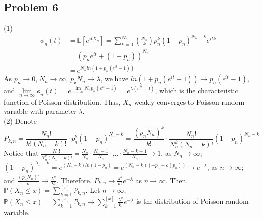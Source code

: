 \documentclass[12pt]{article}
\begin{document}
	\subsection*{Problem 6}
	(1)\begin{align*}
	\phi_{n}(t)&= \mathbb{E}[e^{itX_{n}}]=\sum_{k=0}^{N_{n}}\binom{N_{n}}{k}p_n^{k}(1-p_n)^{N_{n}-k}e^{itk}\\
	&=(p_{n}e^{it}+(1-p_n))^{N_{n}}\\
	&=e^{N_{n}ln(1+p_{n}(e^{it}-1))}
\end{align*}
As $p_n\rightarrow 0$, $N_{n}\rightarrow\infty$, $p_{n}N_{n}\rightarrow \lambda$, we have $ln(1+p_{n}(e^{it}-1))\rightarrow p_{n}(e^{it}-1)$, and $\lim\limits_{n\rightarrow\infty}\phi_{n}(t)= e^{\lim\limits_{n\rightarrow\infty}N_{n}p_{n}(e^{it}-1)}=e^{\lambda (e^{it}-1)}$, which is the characteristic function of Poisson distribution. Thus, $X_{n}$ weakly converges to Poisson random variable with parameter $\lambda$.\\
(2) Denote $$P_{k,n}=\frac{N_{n}!}{k!(N_{n}-k)!}\cdot p_{n}^{k}(1-p_{n})^{N_{n}-k}=\frac{(p_{n}N_{n})^{k}}{k!}\cdot \frac{N_{n}!}{N_{n}^{k}(N_{n}-k)!}(1-p_{n})^{N_{n}-k}$$
Notice that $\frac{N_{n}!}{N_{n}^{k}(N_{n}-k)!}=\frac{N_{n}}{N_{n}}\cdot\frac{N_{n}-1}{N_{n}}\cdot\dots\cdot\frac{N_{n}-k+1}{N_{n}}\rightarrow 1$, as $N_{n}\rightarrow\infty$;\\ 

	$(1-p_{n})^{N_{n}-k}=e^{(N_{n}-k)ln(1-p_{n})}=e^{(N_{n}-k)(-p_{n}+o(p_{n}))}\rightarrow e^{-\lambda}$, as $n\rightarrow\infty$; \\ and $\frac{(p_{n}N_{n})^{k}}{k!}\rightarrow\frac{\lambda^{k}}{k!}$. Therefore, $P_{k,n}\rightarrow\frac{\lambda^{k}}{k!}e^{-\lambda}$ as $n\rightarrow\infty$. Then, $\mathbb{P}(X_{n}\leqslant x)=\sum_{k=1}^{[x]}P_{k,n}$. Let $n\rightarrow\infty$, $\mathbb{P}(X_{n}\leqslant x)=\sum_{k=1}^{[x]}P_{k,n}\rightarrow\sum_{k=1}^{[x]}\frac{\lambda^{k}}{k!}e^{-\lambda}$ is the distribution of Poisson random variable.
\end{document}
